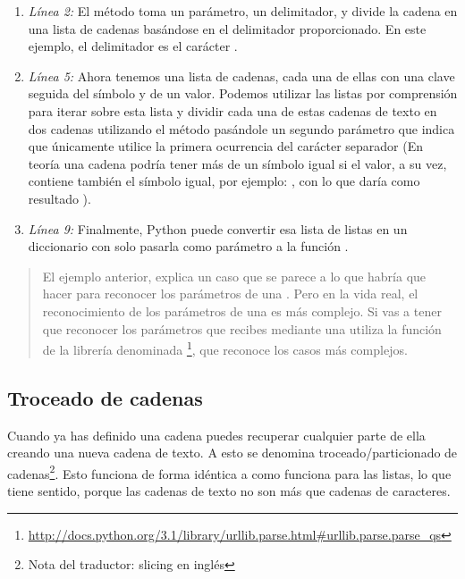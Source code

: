 \begin{enumerate}

\item \emph{Línea 2:} El método  toma un parámetro, un delimitador, y divide la cadena en una lista de cadenas basándose en el delimitador proporcionado. En este ejemplo, el delimitador es el carácter \codigo{\&}.

\item \emph{Línea 5:} Ahora tenemos una lista de cadenas, cada una de ellas con una clave seguida del símbolo \codigo{=} y de un valor. Podemos utilizar las listas por comprensión para iterar sobre esta lista y dividir cada una de estas cadenas de texto en dos cadenas utilizando el método  pasándole un segundo parámetro que indica que únicamente utilice la primera ocurrencia del carácter separador (En teoría una cadena podría tener más de un símbolo igual si el valor, a su vez, contiene también el símbolo igual, por ejemplo: , con lo que  daría como resultado ).

\item \emph{Línea 9:} Finalmente, Python puede convertir esa lista de listas en un diccionario con solo pasarla como parámetro a la función .

\end{enumerate}

\begin{quote}
El ejemplo anterior, explica un caso que se parece a lo que habría que hacer para reconocer los parámetros de una . Pero en la vida real, el reconocimiento de los parámetros de una  es más complejo. Si vas a tener que reconocer los parámetros que recibes mediante una  utiliza la función de la librería  denominada \footnote{\href{http://docs.python.org/3.1/library/urllib.parse.html\#urllib.parse.parse\_qs}{http://docs.python.org/3.1/library/urllib.parse.html\#urllib.parse.parse\_qs}}, que reconoce los casos más complejos.
\end{quote}

\subsection{Troceado de cadenas}

Cuando ya has definido una cadena puedes recuperar cualquier parte de ella creando una nueva cadena de texto. A esto se denomina troceado/particionado de cadenas\footnote{Nota del traductor: slicing en inglés}. Esto funciona de forma idéntica a como funciona para las listas, lo que tiene sentido, porque las cadenas de texto no son más que cadenas de caracteres.


